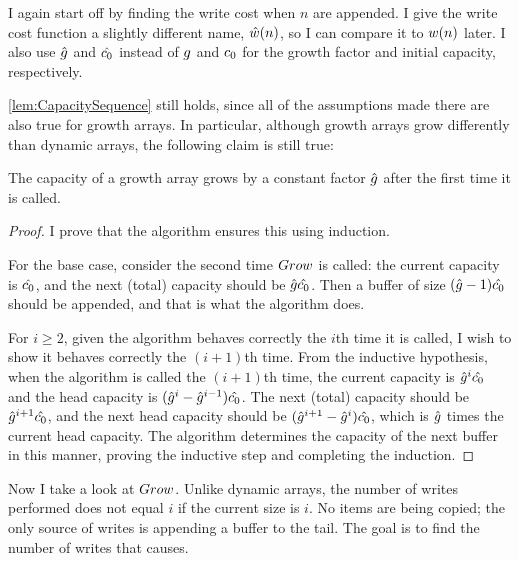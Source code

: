 \HdrGrowthArrayImpl

\HdrTimeComplex

I again start off by finding the write cost when $n$ are appended. I give the write cost function a slightly different name, $\hat{w}(n)$, so I can compare it to $w(n)$ later. I also use $\hat{g}$ and $\hat{c_0}$ instead of $g$ and $c_0$ for the growth factor and initial capacity, respectively.

\ref{lem:CapacitySequence} still holds, since all of the assumptions made there are also true for growth arrays. In particular, although growth arrays grow differently than dynamic arrays, the following claim is still true:

\begin{lemma}
	The capacity of a growth array grows by a constant factor $\hat{g}$ after the first time it is called.
\end{lemma}

\begin{proof}
	I prove that the algorithm ensures this using induction.
	
	For the base case, consider the second time $Grow$ is called: the current capacity is $\hat{c_0}$, and the next (total) capacity should be $\hat{g}\hat{c_0}$. Then a buffer of size $(\hat{g} - 1)\hat{c_0}$ should be appended, and that is what the algorithm does.
	
	For $i \geq 2$, given the algorithm behaves correctly the $i$th time it is called, I wish to show it behaves correctly the $(i + 1)$th time. From the inductive hypothesis, when the algorithm is called the $(i + 1)$th time, the current capacity is $\hat{g}^i\hat{c_0}$ and the head capacity is $(\hat{g}^i - \hat{g}^{i - 1})\hat{c_0}$. The next (total) capacity should be $\hat{g}^{i + 1}\hat{c_0}$, and the next head capacity should be $(\hat{g}^{i + 1} - \hat{g}^i)\hat{c_0}$, which is $\hat{g}$ times the current head capacity. The algorithm determines the capacity of the next buffer in this manner, proving the inductive step and completing the induction.
\end{proof}

Now I take a look at $Grow$. Unlike dynamic arrays, the number of writes performed does not equal $i$ if the current size is $i$. No items are being copied; the only source of writes is appending a buffer to the tail. The goal is to find the number of writes that causes.

